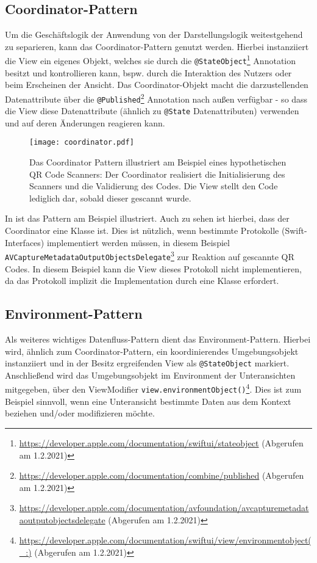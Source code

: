 \subsection{Coordinator-Pattern}

Um die Geschäftslogik der Anwendung von der Darstellungslogik weitestgehend zu separieren, kann das Coordinator-Pattern genutzt werden. Hierbei instanziiert die View ein eigenes Objekt, welches sie durch die \texttt{@StateObject}\footnote{\url{https://developer.apple.com/documentation/swiftui/stateobject} (Abgerufen am 1.2.2021)} Annotation besitzt und kontrollieren kann, bspw. durch die Interaktion des Nutzers oder beim Erscheinen der Ansicht. Das Coordinator-Objekt macht die darzustellenden Datenattribute über die \texttt{@Published}\footnote{\url{https://developer.apple.com/documentation/combine/published} (Abgerufen am 1.2.2021)} Annotation nach außen verfügbar - so dass die View diese Datenattribute (ähnlich zu \texttt{@State} Datenattributen) verwenden und auf deren Änderungen reagieren kann.

\begin{figure}[H]
\texttt{[image: coordinator.pdf]}
\caption{Das Coordinator Pattern illustriert am Beispiel eines hypothetischen QR Code Scanners: Der Coordinator realisiert die Initialisierung des Scanners und die Validierung des Codes. Die View stellt den Code lediglich dar, sobald dieser gescannt wurde.}\label{fig:coordinator}
\end{figure}

\noindent In  ist das Pattern am Beispiel illustriert. Auch zu sehen ist hierbei, dass der Coordinator eine Klasse ist. Dies ist nützlich, wenn bestimmte Protokolle (Swift-Interfaces) implementiert werden müssen, in diesem Beispiel \texttt{AVCaptureMetadataOutputObjectsDelegate}\footnote{\url{https://developer.apple.com/documentation/avfoundation/avcapturemetadataoutputobjectsdelegate} (Abgerufen am 1.2.2021)} zur Reaktion auf gescannte QR Codes. In diesem Beispiel kann die View dieses Protokoll nicht implementieren, da das Protokoll implizit die Implementation durch eine Klasse erfordert.

\subsection{Environment-Pattern}

Als weiteres wichtiges Datenfluss-Pattern dient das Environment-Pattern. Hierbei wird, ähnlich zum Coordinator-Pattern, ein koordinierendes Umgebungsobjekt instanziiert und in der Besitz ergreifenden View als \texttt{@StateObject} markiert. Anschließend wird das Umgebungsobjekt im Environment der Unteransichten mitgegeben, über den ViewModifier \texttt{view.environmentObject()}\footnote{\url{https://developer.apple.com/documentation/swiftui/view/environmentobject(_:)} (Abgerufen am 1.2.2021)}. Dies ist zum Beispiel sinnvoll, wenn eine Unteransicht bestimmte Daten aus dem Kontext beziehen und/oder modifizieren möchte.

